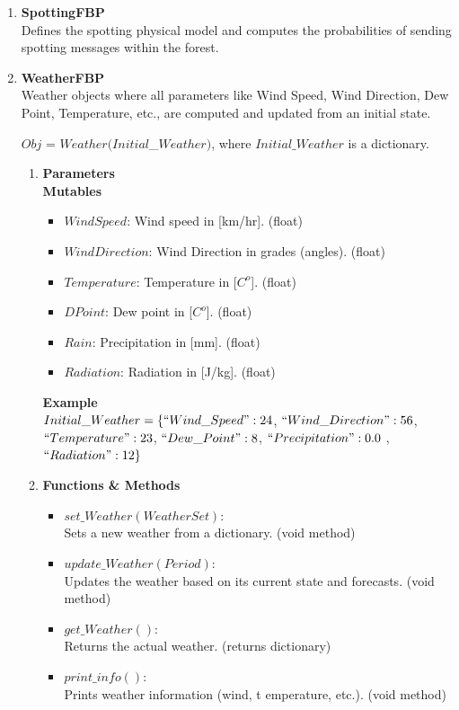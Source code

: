 \documentclass[11pt]{article}
\begin{document}
\begin{enumerate}
	\item \textbf{SpottingFBP}\\
		Defines the spotting physical model and computes the probabilities of sending spotting messages within the forest. 	
	
	\item \textbf{WeatherFBP} \\
	Weather objects where all parameters like Wind Speed, Wind Direction, Dew Point, Temperature, etc., are computed and updated from an initial state. 

$Obj$ = $Weather(Initial$\_$Weather)$, where $Initial\_Weather$ is a dictionary.

	\begin{enumerate}
 		\item \textbf{Parameters}\\
 		\textbf{Mutables}
 			\begin{itemize}
 				\item $WindSpeed$: Wind speed in [km/hr]. \hfill (float)
 				\item $WindDirection$: Wind Direction in grades (angles). \hfill (float) 
 				\item $Temperature$: Temperature in [$C^{o}$]. \hfill (float)
 				\item $DPoint$: Dew point in [$C^{o}$]. \hfill (float)
 				\item $Rain$: Precipitation in [mm]. \hfill (float)
 				\item $Radiation$: Radiation in [J/kg]. \hfill (float)   \\
 			\end{itemize}

	\textbf{Example} \\
	$Initial\_Weather = \lbrace ``Wind\_Speed": 24$, $ ``Wind\_Direction": 56$, $ ``Temperature": 23$, $ ``Dew\_Point": 8$, $ ``Precipitation": 0.0$ , $ ``Radiation": 12 \rbrace$ \\ 			
 			
 		\item \textbf{Functions \& Methods}
 			\begin{itemize}
 				\item $set\_Weather(WeatherSet)$:\\ 
 				Sets a new weather from a dictionary. \hfill (void method) 
 				\item $update\_Weather(Period)$: \\
 				Updates the weather based on its current state and forecasts. \hfill (void method)
 				\item $get\_Weather()$: \\
 				Returns the actual weather. \hfill (returns dictionary) 
 				\item $print\_info()$: \\
 				Prints weather information (wind, t	emperature, etc.). \hfill (void method) 
 			\end{itemize}
 	\end{enumerate}
 	

\end{enumerate}
\end{document}
